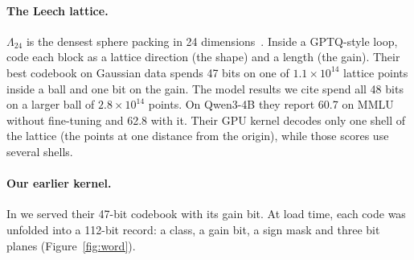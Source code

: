 \paragraph{The Leech lattice.} $\Lambda_{24}$ is the densest sphere packing
in 24 dimensions~\citep{cohn2017}. Inside a GPTQ-style loop,
\citet{llvq2026} code each block as a lattice direction (the shape) and a
length (the gain). Their best codebook on Gaussian data spends 47 bits on one of
$1.1\times10^{14}$ lattice points inside a ball and one bit on the gain. The
model results we cite spend all 48 bits on a larger ball of
$2.8\times10^{14}$ points. On Qwen3-4B they report 60.7 on MMLU without
fine-tuning and 62.8 with it. Their GPU kernel decodes only one shell of the
lattice (the points at one distance from the origin), while those scores use
several shells.

\paragraph{Our earlier kernel.} In \citet{llvq1preprint} we served their
47-bit codebook with its gain bit. At load time, each code was unfolded into a
112-bit \Planes{} record: a class, a gain bit, a sign mask and three bit planes
(Figure~\ref{fig:word}).
